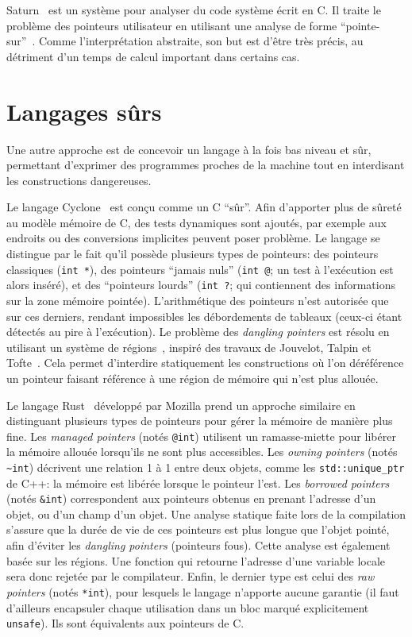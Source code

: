 Saturn~\cite{paste07} est un système pour analyser du code système écrit en C.
Il traite le problème des pointeurs utilisateur en utilisant une analyse de
forme ``pointe-sur''~\cite{oakland08}. Comme l'interprétation abstraite, son but
est d'être très précis, au détriment d'un temps de calcul important dans
certains cas.


\section{Langages sûrs}

Une autre approche est de concevoir un langage à la fois bas niveau et sûr,
permettant d'exprimer des programmes proches de la machine tout en interdisant
les constructions dangereuses.

Le langage Cyclone~\cite{cyclone-safety} est conçu comme un C ``sûr''. Afin
d'apporter plus de sûreté au modèle mémoire de C, des tests dynamiques sont
ajoutés, par exemple aux endroits ou des conversions implicites peuvent poser
problème. Le langage se distingue par le fait qu'il possède plusieurs types de
pointeurs: des pointeurs classiques (\texttt{int *}), des pointeurs ``jamais
nuls'' (\texttt{int @}; un test à l'exécution est alors inséré), et des
``pointeurs lourds'' (\verb!int ?!; qui contiennent des informations sur la
zone mémoire pointée). L'arithmétique des pointeurs n'est autorisée que sur ces
derniers, rendant impossibles les débordements de tableaux (ceux-ci étant
détectés au pire à l'exécution). Le problème des \emph{dangling pointers} est
résolu en utilisant un système de régions~\cite{cyclone-regions}, inspiré des
travaux de Jouvelot, Talpin et Tofte~\cite{jfp92,ToTa1993,popl94}. Cela permet
d'interdire statiquement les constructions où l'on déréférence un pointeur
faisant référence à une région de mémoire qui n'est plus allouée.

Le langage Rust~ développé par Mozilla prend un approche similaire en
distinguant plusieurs types de pointeurs pour gérer la mémoire de manière plus
fine. Les \emph{managed pointers} (notés \texttt{@int}) utilisent un
ramasse-miette pour libérer la mémoire allouée lorsqu'ils ne sont plus
accessibles. Les \emph{owning pointers} (notés \texttt{\textasciitilde{}int})
décrivent une relation 1 à 1 entre deux objets, comme les
\texttt{std::unique\_ptr} de C++: la mémoire est libérée lorsque le pointeur
l'est. Les \emph{borrowed pointers} (notés \texttt{\&int}) correspondent aux
pointeurs obtenus en prenant l'adresse d'un objet, ou d'un champ d'un objet. Une
analyse statique faite lors de la compilation s'assure que la durée de vie de
ces pointeurs est plus longue que l'objet pointé, afin d'éviter les
\emph{dangling pointers} (pointeurs fous). Cette analyse est également basée sur
les régions. Une fonction qui retourne l'adresse d'une variable locale sera donc
rejetée par le compilateur. Enfin, le dernier type est celui des \emph{raw
pointers} (notés \texttt{*int}), pour lesquels le langage n'apporte aucune
garantie (il faut d'ailleurs encapsuler chaque utilisation dans un bloc marqué
explicitement \texttt{unsafe}). Ils sont équivalents aux pointeurs de C.

